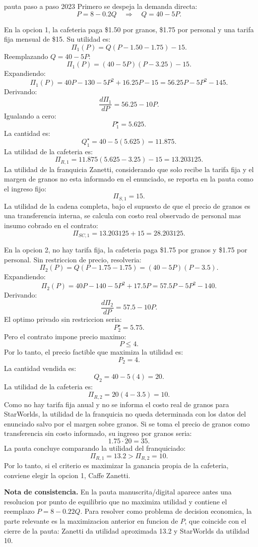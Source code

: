\begin{pautacompleta}{pauta paso a paso 2023}
Primero se despeja la demanda directa:
\[
  P=8-0.2Q
  \quad\Rightarrow\quad
  Q=40-5P.
\]

En la opcion 1, la cafeteria paga \$1.50 por granos, \$1.75 por personal y una tarifa fija mensual de \$15. Su utilidad es:
\[
  \Pi_1(P)=Q(P-1.50-1.75)-15.
\]
Reemplazando $Q=40-5P$:
\[
  \Pi_1(P)=(40-5P)(P-3.25)-15.
\]
Expandiendo:
\[
  \Pi_1(P)=40P-130-5P^2+16.25P-15
  =56.25P-5P^2-145.
\]
Derivando:
\[
  \frac{d\Pi_1}{dP}=56.25-10P.
\]
Igualando a cero:
\[
  P_1^\star=5.625.
\]
La cantidad es:
\[
  Q_1^\star=40-5(5.625)=11.875.
\]
La utilidad de la cafeteria es:
\[
  \Pi_{R,1}=11.875(5.625-3.25)-15=13.203125.
\]
La utilidad de la franquicia Zanetti, considerando que solo recibe la tarifa fija y el margen de granos no esta informado en el enunciado, se reporta en la pauta como el ingreso fijo:
\[
  \Pi_{S,1}=15.
\]
La utilidad de la cadena completa, bajo el supuesto de que el precio de granos es una transferencia interna, se calcula con costo real observado de personal mas insumo cobrado en el contrato:
\[
  \Pi_{SC,1}=13.203125+15=28.203125.
\]

En la opcion 2, no hay tarifa fija, la cafeteria paga \$1.75 por granos y \$1.75 por personal. Sin restriccion de precio, resolveria:
\[
  \Pi_2(P)=Q(P-1.75-1.75)=(40-5P)(P-3.5).
\]
Expandiendo:
\[
  \Pi_2(P)=40P-140-5P^2+17.5P
  =57.5P-5P^2-140.
\]
Derivando:
\[
  \frac{d\Pi_2}{dP}=57.5-10P.
\]
El optimo privado sin restriccion seria:
\[
  P_2^\star=5.75.
\]
Pero el contrato impone precio maximo:
\[
  P\leq 4.
\]
Por lo tanto, el precio factible que maximiza la utilidad es:
\[
  P_2=4.
\]
La cantidad vendida es:
\[
  Q_2=40-5(4)=20.
\]
La utilidad de la cafeteria es:
\[
  \Pi_{R,2}=20(4-3.5)=10.
\]
Como no hay tarifa fija anual y no se informa el costo real de granos para StarWorlds, la utilidad de la franquicia no queda determinada con los datos del enunciado salvo por el margen sobre granos. Si se toma el precio de granos como transferencia sin costo informado, su ingreso por granos seria:
\[
  1.75\cdot 20=35.
\]
La pauta concluye comparando la utilidad del franquiciado:
\[
  \Pi_{R,1}=13.2>\Pi_{R,2}=10.
\]
Por lo tanto, si el criterio es maximizar la ganancia propia de la cafeteria, conviene elegir la opcion 1, Caffe Zanetti.

\textbf{Nota de consistencia.} En la pauta manuscrita/digital aparece antes una resolucion por punto de equilibrio que no maximiza utilidad y contiene el reemplazo $P=8-0.22Q$. Para resolver como problema de decision economica, la parte relevante es la maximizacion anterior en funcion de $P$, que coincide con el cierre de la pauta: Zanetti da utilidad aproximada 13.2 y StarWorlds da utilidad 10.
\end{pautacompleta}
